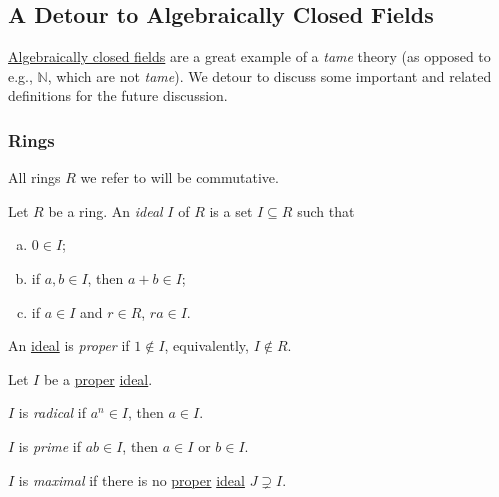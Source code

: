 \subsection{A Detour to Algebraically Closed Fields}
\hyperref[def:algebraically-closed]{Algebraically closed fields} are a great example of a \emph{tame} theory (as opposed to e.g., \(\mathbb{N} \), which are not \emph{tame}). We detour to discuss some important and related definitions for the future discussion.

\subsubsection{Rings}
All rings \(R\) we refer to will be commutative.

\begin{definition}[Ideal]\label{def:ideal}
	Let \(R\) be a ring. An \emph{ideal} \(I\) of \(R\) is a set \(I \subseteq R\) such that
	\begin{enumerate}[(a)]
		\item \(0\in I\);
		\item if \(a, b\in I\), then \(a+b\in I\);
		\item if \(a\in I\) and \(r\in R\), \(ra\in I\).
	\end{enumerate}
\end{definition}

\begin{definition}[Proper]\label{def:proper}
	An \hyperref[def:ideal]{ideal} is \emph{proper} if \(1 \notin I\), equivalently, \(I \notin R\).
\end{definition}

\begin{definition*}
	Let \(I\) be a \hyperref[def:proper]{proper} \hyperref[def:ideal]{ideal}.

	\begin{definition}[Radical]\label{def:radical}
		\(I\) is \emph{radical}	if \(a^n\in I\), then \(a\in I\).
	\end{definition}

	\begin{definition}[Prime]\label{def:prime}
		\(I\) is \emph{prime} if \(ab\in I\), then \(a\in I\) or \(b\in I\).
	\end{definition}

	\begin{definition}[Maximal]\label{def:proper-ideal-maximal}
		\(I\) is \emph{maximal} if there is no \hyperref[def:proper]{proper} \hyperref[def:ideal]{ideal} \(J \supsetneq I \).
	\end{definition}
\end{definition*}

